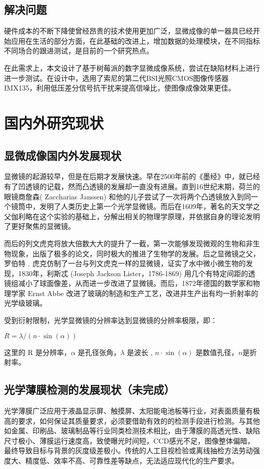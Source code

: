 \subsection{解决问题}
硬件成本的不断下降使曾经昂贵的技术使用更加广泛，显微成像的单一器具已经开始应用在生活的部分方面，在此基础的改进上，增加数据的处理模块，在不同指标不同场合的跟进测试，是目前的一个研究热点。

在此需求上，本文设计了基于树莓派的数字显微成像系统，尝试在缺陷材料上进行进一步测试。在设计中，选用了索尼的第二代BSI光照CMOS图像传感器IMX135，利用低压差分信号抗干扰来提高信噪比，使图像成像效果更佳。


\section{国内外研究现状}
\subsection{显微成像国内外发展现状}
显微镜的起源较早，但是在后期才发展快速。早在2500年前的《墨经》中，就已经有了凹透镜的记载，然而凸透镜的发展却一直没有进展。直到16世纪末期，荷兰的眼镜商詹森( Zaccharias Janssen) 和他的儿子尝试了一次将两个凸透镜放入到同一个镜筒中，发明了人类历史上第一个光学显微镜。而后在1609年，著名的天文学之父伽利略在这个实验的基础上，分解出相关的物理学原理，并依据自身的理论发明了更好聚焦的显微镜。

而后的列文虎克将放大倍数大大的提升了一截，第一次能够发现微观的生物和非生物现象，出版了极多的论文，同时极大的推进了生物学的发展。后之显微镜之父，罗伯特﹒虎克仿制了一台与列文虎克一样的显微镜，证实了水中微小微生物的发现，1830年，利斯忒 (Joseph Jackson Lister，1786-1869) 用几个有特定间距的透镜组减小了球面像差，从而进一步改进了显微镜。而后，1872年德国的数学家和物理学家 Ernst Abbe 改进了玻璃的制造和生产工艺，改进并生产出有均一折射率的光学级玻璃。\cite{microimaging}\cite{microimagingelc}

受到衍射限制，光学显微镜的分辨率达到显微镜的分辨率极限，即：
\begin{center}
	$ R = \lambda/(n \cdot \sin(\alpha)) $ 
\end{center}
这里的 R 是分辨率，$\alpha$ 是孔径张角，$\lambda$ 是波长 , $n\cdot\sin(\alpha)$ 是数值孔径，$n$是折射率。 
	

\subsection{光学薄膜检测的发展现状（未完成）}
 光学薄膜广泛应用于液晶显示屏、触摸屏、太阳能电池板等行业，对表面质量有极高的要求，如何保证其质量要求，必须要借助有效的的检测手段进行检测。与其他如金属、印刷品、玻璃制品等行业同类检测技术相比，由于薄膜的高透光性、缺陷尺寸极小、薄膜运行速度高，致使曝光时间短，CCD感光不足，图像整体偏暗，最终导致目标与背景的灰度级差极小。\cite{CCDCMOSf}传统的人工目视检验或离线抽检方法劳动强度大、精度低、效率不高、可靠性差等缺点，无法适应现代化的生产要求。


